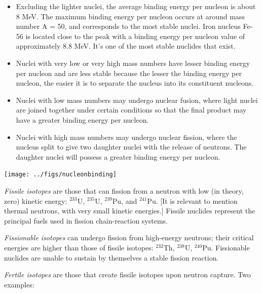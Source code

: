 \documentclass[12pt]{article}
\newif\ifeqns
\begin{document}
\begin{itemize}
\item Excluding the lighter nuclei, the average binding energy per nucleon is about 8 MeV.
The maximum binding energy per nucleon occurs at around mass number A = 50, and corresponds to the most stable nuclei. Iron nucleus Fe-56 is located close to the peak with a binding energy per nucleon value of approximately 8.8 MeV. It's one of the most stable nuclides that exist.
\item Nuclei with very low or very high mass numbers have lesser binding energy per nucleon and are less stable because the lesser the binding energy per nucleon, the easier it is to separate the nucleus into its constituent nucleons.
\item Nuclei with low mass numbers may undergo nuclear fusion, where light nuclei are joined together under certain conditions so that the final product may have a greater binding energy per nucleon.
\item Nuclei with high mass numbers may undergo nuclear fission, where the nucleus split to give two daughter nuclei with the release of neutrons. The daughter nuclei will possess a greater binding energy per nucleon.
\end{itemize}


\begin{center}
\texttt{[image: ../figs/nucleonbinding]}
\end{center}


\textit{Fissile isotopes} are those that can fission from a neutron with low (in theory, zero) kinetic energy: $^{233}$U, $^{235}$U, $^{239}$Pu, and $^{241}$Pu. [It is relevant to mention thermal neutrons, with very small kinetic energies.] Fissile nuclides represent the principal fuels used in fission chain-reaction systems. 

\textit{Fissionable isotopes} can undergo fission from high-energy neutrons; their critical energies are higher than those of fissile isotopes: $^{232}$Th, $^{238}$U, $^{240}$Pu. Fissionable nuclides are unable to sustain by themselves a stable fission reaction.

\textit{Fertile isotopes} are those that create fissile isotopes upon neutron capture. Two examples:
\ifeqns
$^{238}\text{U}+n \stackrel{\gamma}{\rightarrow} \, ^{239}\text{U}\stackrel{\beta^-}{\rightarrow} \, ^{239}\text{Np}\stackrel{\beta^-}{\rightarrow} \, ^{239}\text{Pu}$

$^{232}\text{Th}+n \stackrel{\gamma}{\rightarrow} \,^{233}\text{Th}\stackrel{\beta^-}{\rightarrow}\, ^{233}\text{Pa}\stackrel{\beta^-}{\rightarrow} \, ^{233}\text{U}$
\else
\vspace*{3 em}
\fi
\end{document}

